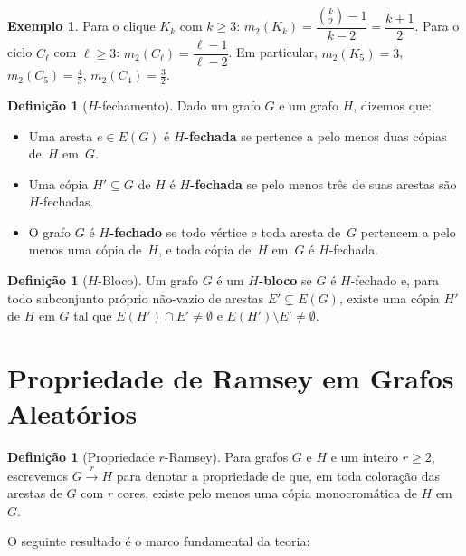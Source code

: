 \documentclass[reqno, 12pt]{amsart}
\numberwithin{equation}{section}
\theoremstyle{plain}
\theoremstyle{definition}
\newtheorem{definition}[theorem]{Definição}
\newtheorem{example}[theorem]{Exemplo}
\newcommand{\ramsey}[1]{\xrightarrow{\,#1\,}}
\newcommand{\mdens}{m_2}
\begin{document}
\begin{example}
    Para o clique $K_k$ com $k \ge 3$:
    $\mdens(K_k) = \dfrac{\binom{k}{2}-1}{k-2} = \dfrac{k+1}{2}$.
    Para o ciclo $C_\ell$ com $\ell \ge 3$:
    $\mdens(C_\ell) = \dfrac{\ell-1}{\ell-2}$.
    Em particular,
    $\mdens(K_5) = 3$, $\mdens(C_5) = \frac{4}{3}$, $\mdens(C_4) = \frac{3}{2}$.
\end{example}

\begin{definition}[$H$-fechamento]
    \label{def:H-fechado}
    Dado um grafo $G$ e um grafo $H$, dizemos que:
    \begin{itemize}
        \item Uma aresta $e \in E(G)$ é \textbf{$H$-fechada} se pertence a pelo menos duas cópias de~$H$ em~$G$.
        \item Uma cópia $H' \subseteq G$ de $H$ é \textbf{$H$-fechada} se pelo menos três de suas arestas são $H$-fechadas.
        \item O grafo $G$ é \textbf{$H$-fechado} se todo vértice e toda aresta de~$G$ pertencem a pelo menos uma cópia de~$H$, e toda cópia de~$H$ em~$G$ é $H$-fechada.
    \end{itemize}
\end{definition}

\begin{definition}[$H$-Bloco]
    \label{def:H-bloco}
    Um grafo $G$ é um \textbf{$H$-bloco} se $G$ é $H$-fechado e, para todo subconjunto próprio não-vazio de arestas $E' \subsetneq E(G)$, existe uma cópia $H'$ de $H$ em $G$ tal que $E(H') \cap E' \ne \emptyset$ e $E(H') \setminus E' \ne \emptyset$.
\end{definition}

\section{Propriedade de Ramsey em Grafos Aleatórios}

\begin{definition}[Propriedade $r$-Ramsey]
    Para grafos $G$ e $H$ e um inteiro $r \ge 2$, escrevemos
    $G \ramsey{r} H$ para denotar a propriedade de que,
    em toda coloração das arestas de $G$ com $r$ cores,
    existe pelo menos uma cópia monocromática de $H$ em $G$.
\end{definition}

O seguinte resultado é o marco fundamental da teoria:
\end{document}
